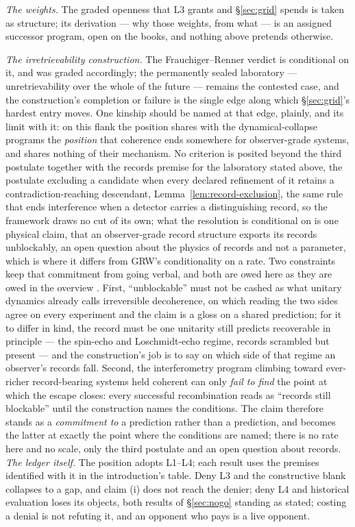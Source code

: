 \emph{The weights.} The graded openness that L3 grants and \S\ref{sec:grid} spends is taken as structure; its derivation --- why those weights, from what --- is an assigned successor program, open on the books, and nothing above pretends otherwise.

\emph{The irretrievability construction.} The Frauchiger--Renner verdict is conditional on it, and was graded accordingly; the permanently sealed laboratory --- unretrievability over the whole of the future --- remains the contested case, and the construction's completion or failure is the single edge along which \S\ref{sec:grid}'s hardest entry moves. One kinship should be named at that edge, plainly, and its limit with it: on this flank the position shares with the dynamical-collapse programs the \emph{position} that coherence ends somewhere for observer-grade systems, and shares nothing of their mechanism. No criterion is posited beyond the third postulate together with the records premise for the laboratory stated above, the postulate excluding a candidate when every declared refinement of it retains a contradiction-reaching descendant, Lemma~\ref{lem:record-exclusion}, the same rule that ends interference when a detector carries a distinguishing record, so the framework draws no cut of its own; what the resolution is conditional on is one physical claim, that an observer-grade record structure exports its records unblockably, an open question about the physics of records and not a parameter, which is where it differs from GRW's conditionality on a rate.
Two constraints keep that commitment from going verbal, and both are owed here as they are owed in the overview \cite{AethusBrief}. First, ``unblockable'' must not be cashed as what unitary dynamics already calls irreversible decoherence, on which reading the two sides agree on every experiment and the claim is a gloss on a shared prediction; for it to differ in kind, the record must be one unitarity still predicts recoverable in principle --- the spin-echo and Loschmidt-echo regime, records scrambled but present --- and the construction's job is to say on which side of that regime an observer's records fall. Second, the interferometry program climbing toward ever-richer record-bearing systems held coherent can only \emph{fail to find} the point at which the escape closes: every successful recombination reads as ``records still blockable'' until the construction names the conditions. The claim therefore stands as a \emph{commitment to} a prediction rather than a prediction, and becomes the latter at exactly the point where the conditions are named; there is no rate here and no scale, only the third postulate and an open question about records.
\emph{The ledger itself.} The position adopts L1--L4; each result uses the premises identified with it in the introduction's table. Deny L3 and the constructive blank collapses to a gap, and claim (i) does not reach the denier; deny L4 and historical evaluation loses its objects, both results of \S\ref{sec:nogo} standing as stated; costing a denial is not refuting it, and an opponent who pays is a live opponent.

